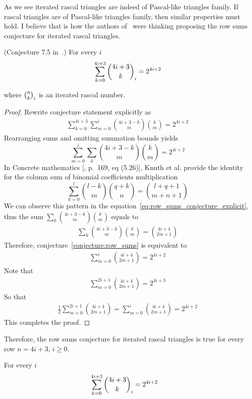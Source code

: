﻿As we see iterated rascal triangles are indeed of Pascal-like triangles family.
If rascal triangles are of Pascal-like triangles family, then similar properties must hold.
I believe that is how the authors of~\cite{gregory2023iterated} were thinking
proposing the row sums conjecture for iterated rascal triangles.
\begin{conjecture}
    \label{conjecture:row_sums}
    (Conjecture 7.5 in~\cite{gregory2023iterated}.)
    For every $i$
    \begin{align*}
        \sum_{k=0}^{4i+3} \binom{4i+3}{k}_{i} = 2^{4i+2}
    \end{align*}
\end{conjecture}
where $\binom{n}{k}_{i}$ is an iterated rascal number.
\begin{proof}
    Rewrite conjecture statement explicitly as
    \begin{align*}
        \sum_{k=0}^{4i+3} \sum_{m=0}^{i} \binom{4i+3-k}{m} \binom{k}{m} = 2^{4i+2}
    \end{align*}
    Rearranging sums and omitting summation bounds yields
    \begin{equation}
        \sum_{m=0}^{i}  \sum_{k} \binom{4i+3-k}{m} \binom{k}{m} = 2^{4i+2}\label{eq:row_sums_conjecture_explicit}
    \end{equation}
    In Concrete mathematics [\cite{graham1994concrete}, p.\ 169, eq (5.26)], Knuth et al.
    provide the identity for the column sum of binomial coefficients multiplication
    \begin{equation}
        \label{eq:binomial_coefficients_column_sum}
        \sum_{k=0}^{l} \binom{l-k}{m} \binom{q+k}{n} = \binom{l+q+1}{m+n+1}
    \end{equation}
    We can observe this pattern in the equation~\eqref{eq:row_sums_conjecture_explicit},
    thus the sum $\sum_{k} \binom{4i+3-k}{m} \binom{k}{m}$ equals to
    \begin{align*}
        \sum_{k} \binom{4i+3-k}{m} \binom{k}{m} = \binom{4i+4}{2m+1}
    \end{align*}
    Therefore, conjecture~\eqref{conjecture:row_sums} is equivalent to
    \begin{align*}
        \sum_{m=0}^{i} \binom{4i+4}{2m+1} = 2^{4i+2}
    \end{align*}
    Note that
    \begin{align*}
        \sum_{m=0}^{2i+1} \binom{4i+4}{2m+1} = 2^{4i+3}
    \end{align*}
    So that
    \begin{align*}
        \frac{1}{2} \sum_{m=0}^{2i+1} \binom{4i+4}{2m+1} = \sum_{m=0}^{i} \binom{4i+4}{2m+1} = 2^{4i+2}
    \end{align*}
    This completes the proof.
\end{proof}
Therefore, the row sums conjecture for iterated rascal triangles is true for every row $n=4i+3$, $i \geq 0$.
\begin{proposition}
    For every $i$
    \begin{align*}
        \sum_{k=0}^{4i+3} \binom{4i+3}{k}_{i} &= 2^{4i+2}
    \end{align*}
\end{proposition}
